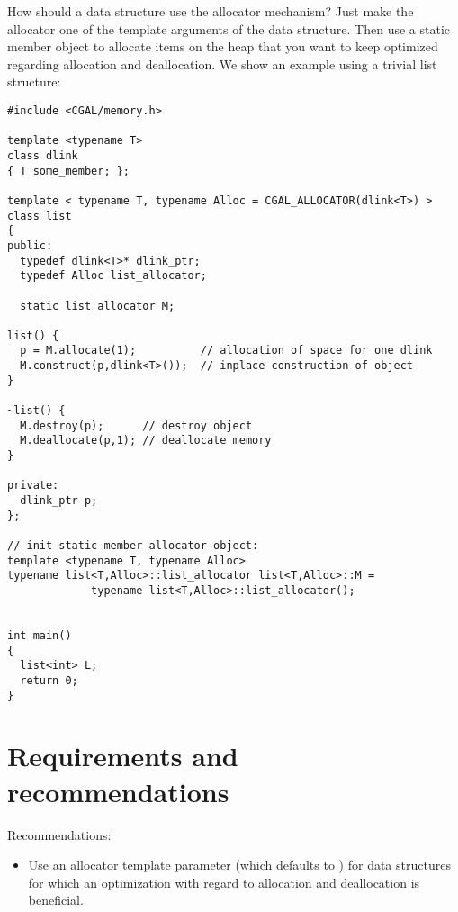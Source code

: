 How should a data structure use the allocator mechanism? Just make the
allocator one of the template arguments of the data structure. Then
use a static member object to allocate items on the heap that you
want to keep optimized regarding allocation and deallocation. We
show an example using a trivial list structure:

\begin{verbatim}
#include <CGAL/memory.h>

template <typename T> 
class dlink 
{ T some_member; };

template < typename T, typename Alloc = CGAL_ALLOCATOR(dlink<T>) >
class list 
{
public:
  typedef dlink<T>* dlink_ptr;
  typedef Alloc list_allocator;

  static list_allocator M;

list() {
  p = M.allocate(1);          // allocation of space for one dlink
  M.construct(p,dlink<T>());  // inplace construction of object
}

~list() {
  M.destroy(p);      // destroy object
  M.deallocate(p,1); // deallocate memory
}

private:
  dlink_ptr p;
};

// init static member allocator object:
template <typename T, typename Alloc>
typename list<T,Alloc>::list_allocator list<T,Alloc>::M =
             typename list<T,Alloc>::list_allocator();


int main()
{
  list<int> L;
  return 0;
}
\end{verbatim}

\section{Requirements and recommendations\label{sec:memory_req_and_rec}}

\noindent
Recommendations:
\begin{itemize}
   \item Use an allocator template parameter (which defaults to
         ) for data structures for which an optimization
         with regard to allocation and deallocation is beneficial.
\end{itemize}
